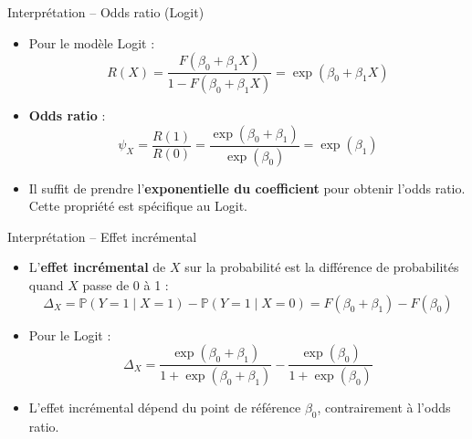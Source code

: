 \documentclass[11pt,aspectratio=169]{beamer}
\newcommand{\PP}{\mathbb{P}}
\begin{document}
\begin{frame}{Interprétation -- Odds ratio (Logit)}

\begin{itemize}

\item Pour le modèle Logit :
  \[
  R(X) = \frac{F(\beta_0 + \beta_1 X)}{1 - F(\beta_0 + \beta_1 X)} = \exp(\beta_0 + \beta_1 X)
  \]

\item \textbf{Odds ratio} :
  \[
  \boxed{\psi_X = \frac{R(1)}{R(0)} = \frac{\exp(\beta_0 + \beta_1)}{\exp(\beta_0)} = \exp(\beta_1)}
  \]

\item Il suffit de prendre l'\textbf{exponentielle du coefficient} pour
  obtenir l'odds ratio. Cette propriété est spécifique au Logit.

\end{itemize}

\end{frame}

\begin{frame}{Interprétation -- Effet incrémental}

\begin{itemize}

\item L'\textbf{effet incrémental} de $X$ sur la probabilité est la
  différence de probabilités quand $X$ passe de 0 à 1 :
  \[
  \Delta_X = \PP(Y=1 \mid X=1) - \PP(Y=1 \mid X=0) = F(\beta_0 + \beta_1) - F(\beta_0)
  \]

\item Pour le Logit :
  \[
  \Delta_X = \frac{\exp(\beta_0 + \beta_1)}{1 + \exp(\beta_0 + \beta_1)} - \frac{\exp(\beta_0)}{1 + \exp(\beta_0)}
  \]

\item L'effet incrémental dépend du point de référence $\beta_0$,
  contrairement à l'odds ratio.

\end{itemize}

\end{frame}
\end{document}
